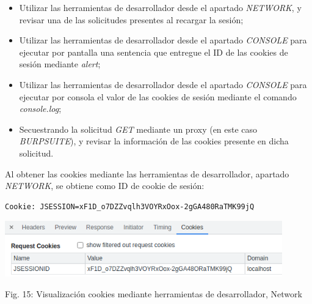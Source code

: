 \documentclass[12pt,oneside,a4paper]{book}
\begin{document}
\begin{enumerate}
\begin{enumerate}
        \vspace{1em}
        
            \begin{itemize}
                \item Utilizar las herramientas de desarrollador desde el apartado \textit{NETWORK}, y revisar una de las solicitudes presentes al recargar la sesión;
                \item Utilizar las herramientas de desarrollador desde el apartado \textit{CONSOLE} para ejecutar por pantalla una sentencia que entregue el ID de las cookies de sesión mediante \textit{alert};
                \item Utilizar las herramientas de desarrollador desde el apartado \textit{CONSOLE} para ejecutar por consola el valor de las cookies de sesión mediante el comando \textit{console.log};
                \item Secuestrando la solicitud \textit{GET} mediante un proxy (en este caso \textit{BURPSUITE}), y revisar la información de las cookies presente en dicha solicitud.
            \end{itemize}
        
        \vspace{1em}

        \hspace{20pt}
        Al obtener las cookies mediante las herramientas de desarrollador, apartado \textit{NETWORK}, se obtiene como ID de cookie de sesión:

        \vspace{1em}

        \begin{verbatim}
Cookie: JSESSION=xF1D_o7DZZvqlh3VOYRxOox-2gGA480RaTMK99jQ
        \end{verbatim}
        
        \vspace{2em} 
        
        \begin{center}
            \includegraphics[width=12cm]{img/xss1.png}
            
            \vspace{0.1em}
            
            Fig. 15: Visualización cookies mediante herramientas de desarrollador, Network
        \end{center}
        

\end{enumerate}
\end{enumerate}
\end{document}
